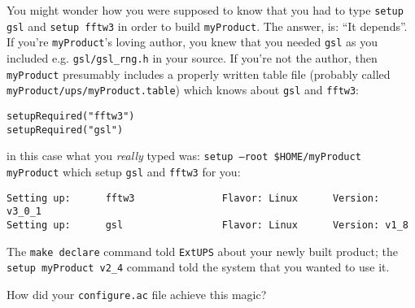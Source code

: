 \documentclass{article}
\newcommand{\code}[1]{\texttt{#1}}
\newcommand{\file}[1]{\texttt{#1}}
\newcommand{\eups}{\code{ExtUPS}}
\begin{document}
You might wonder how you were supposed to know that you had to type
\code{setup gsl} and \code{setup fftw3} in order to build
\code{myProduct}. The answer, is: ``It depends''.  If you're
\code{myProduct}'s loving author, you knew that you needed
\code{gsl} as you included e.g. \code{gsl/gsl\_rng.h} in your
source. If you're not the author, then \code{myProduct} presumably
includes a properly written table file (probably called
\code{myProduct/ups/myProduct.table}) which knows about
\code{gsl} and \code{fftw3}:
\begin{verbatim}
setupRequired("fftw3")
setupRequired("gsl")
\end{verbatim}
in this case what you \textit{really} typed was:\hfil\break
\code{setup --root \$HOME/myProduct myProduct}\hfil\break
which setup \code{gsl} and \code{fftw3} for you:
\begin{verbatim}
Setting up:      fftw3               Flavor: Linux      Version: v3_0_1
Setting up:      gsl                 Flavor: Linux      Version: v1_8
\end{verbatim}

The \code{make declare} command told \eups{} about your newly built
product; the \code{setup myProduct v2\_4} command told the system
that you wanted to use it.

How did your \file{configure.ac} file achieve this magic?
\end{document}
